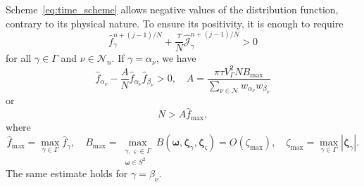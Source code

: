 \documentclass[]{elsarticle} %
\newcommand{\bzeta}{\boldsymbol{\zeta}}
\newcommand{\Nu}{\mathcal{N}}
\newcommand{\OO}[1]{O(#1)}
\begin{document}
Scheme~\eqref{eq:time_scheme} allows negative values of the distribution function,
contrary to its physical nature.
To ensure its positivity, it is enough to require
\begin{equation}\label{eq:positive_f}
    \hat{f}_\gamma^{n+(j-1)/N} + \frac{\tau}N \hat{\mathscr{J}}_\gamma^{n+(j-1)/N} > 0
\end{equation}
for all \(\gamma\in\Gamma\) and \(\nu\in\Nu_n\).
If \(\gamma = \alpha_\nu\), we have
\begin{equation}\label{eq:positive_f_alpha}
    \hat{f}_{\alpha_\nu} - \frac{A}{N}\hat{f}_{\alpha_\nu}\hat{f}_{\beta_\nu} > 0, \quad
    A = \frac{\pi\tau V_\Gamma^2 N B_{\max}}{\sum_{\nu\in\Nu} w_{\alpha_\nu}w_{\beta_\nu}}
\end{equation}
or
\begin{equation}\label{eq:positive_f_alpha2}
    N > A \hat{f}_{\max},
\end{equation}
where
\begin{equation}\label{eq:f_B_max}
    \hat{f}_{\max} = \max_{\gamma\in\Gamma} \hat{f}_\gamma, \quad
    B_{\max} = \max_{\substack{\gamma,\varsigma\in\Gamma\\\boldsymbol{\omega}\in S^2}}
        B(\boldsymbol{\omega}, \bzeta_{\gamma}, \bzeta_{\varsigma}) = \OO{\zeta_{\max}}, \quad
    \zeta_{\max} = \max_{\gamma\in\Gamma}|\bzeta_\gamma|.
\end{equation}
The same estimate holds for \(\gamma = \beta_\nu\).
\end{document}
